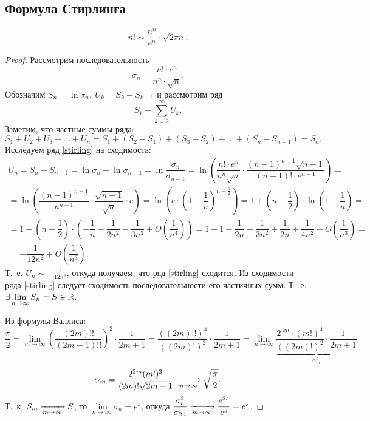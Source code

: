 \documentclass[../../main.tex]{subfiles}
\begin{document}
\subsection{Формула Стирлинга}
\begin{thm}
\[
n! \sim \dfrac{n^n}{e^n}\cdot\sqrt{2\pi n}.
\]
\end{thm}

\begin{proof}
Рассмотрим последовательность
\[\sigma_n = \dfrac{n! \cdot e^n}{n^n \cdot \sqrt{n}}.\]
Обозначим $ S_n = \ln{\sigma_n},\ U_k = S_k - S_{k-1}$ и рассмотрим ряд
\begin{equation}
\label{stirling} S_1 + \sum\limits_{k=2}^\infty U_k.
\end{equation}
Заметим, что частные суммы ряда:
\[ 
S_1 + U_2 + U_3 + \ldots + U_n = S_1 + \left(S_2 - S_1\right) + 
\left(S_3 - S_2\right) + \ldots + \left(S_n - S_{n - 1}\right) = S_n.
\]
Исследуем ряд \eqref{stirling} на сходимость:
\begin{gather*}
U_n = S_n - S_{n - 1} = \ln\sigma_n - \ln\sigma_{n - 1} = 
\ln\dfrac{\sigma_n}{\sigma_{n - 1}} = \ln\left(\dfrac{n! \cdot 
e^n}{n^n\sqrt{n}}
\cdot \dfrac{(n - 1)^{n - 1}\sqrt{n - 1}}{(n - 1)! \cdot e^{n -1}}\right) =
\\
= \ln\left(\dfrac{(n - 1)^{n - 1}}{n^{n - 1}} \cdot \dfrac{\sqrt{n - 
1}}{\sqrt{n}}
\cdot e\right) = \ln \left(e\cdot \left(1 - \dfrac{1}{n} \right)^{n - 
\frac{1}{2}}\right) = 
1 + \left(n - \dfrac{1}{2} \right) \cdot\ln \left( 1 - \dfrac{1}{n} \right) =
\\
= 1 + \left( n - \dfrac{1}{2} \right)\cdot\left(-\dfrac{1}{n} - \dfrac{1}{2n^2}
- \dfrac{1}{3n^3} + O\left(\dfrac{1}{n^4} \right) \right) = 
1 - 1 - \dfrac{1}{2n} - \dfrac{1}{3n^2} + \dfrac{1}{2n} + \dfrac{1}{4n^2}
+ O\left( \dfrac{1}{n^3} \right) = 
\\
= -\dfrac{1}{12n^2} + O\left( \dfrac{1}{n^3}\right).
\end{gather*}
Т.~е. $U_n \sim -\frac{1}{12n^2}$, откуда получаем, что ряд \eqref{stirling} 
сходится.
Из сходимости ряда \eqref{stirling} следует сходимость
последовательности его частичных сумм. Т.~е. $ \exists 
\lim\limits_{n\to\infty} S_n = S \in \mathbb{R}$.

Из формулы Валлиса:
\[
\dfrac{\pi}{2} = \lim\limits_{m \to \infty} \left( \dfrac{(2m)!!}{(2m - 1)!!}
\right)^2\cdot \dfrac{1}{2m + 1} = \dfrac{((2m)!!)^4}{((2m)!)^2} \cdot
\dfrac{1}{2m + 1} = \lim\limits_{n \to \infty} 
\underbrace{\dfrac{2^{4m}\cdot(m!)^4}{((2m)!)^2} 
\cdot \dfrac{1}{2m + 1}}_{\alpha_m^2}.
\]
\[
\alpha_m = \dfrac{2^{2m}(m!)^2}{(2m)!\sqrt{2m + 1}} \xrightarrow[m\to\infty]{} 
\sqrt{\dfrac{\pi}{2}}.
\]
Т.~к. $ S_m \xrightarrow[m\to\infty]{} S $, то $ \lim\limits_{n \to \infty} \sigma_n = 
e^s$, откуда 
$\dfrac{\sigma_n^2}{\sigma_{2n}} \xrightarrow[m\to\infty]{}  \dfrac{e^{2s}}{e^s} = e^s 
$.


\end{proof}
\end{document}
